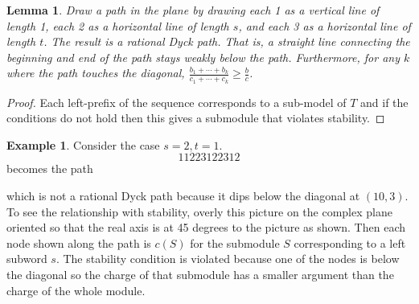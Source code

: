 \documentclass{amsart}
\numberwithin{equation}{section}
\numberwithin{figure}{section}
\numberwithin{table}{section}
\newtheorem{Lemma}[equation]{Lemma}
\theoremstyle{definition}
\newtheorem{Example}[equation]{Example}
\begin{document}
\begin{Lemma} \label{lem:Dyck}
Draw a path in the plane by drawing each 1 as a vertical line of length 1, each 2 as a horizontal line of length $s$, and each 3 as a horizontal line of length $t$. The result is a rational Dyck path. That is, a straight line connecting the beginning and end of the path stays weakly below the path. Furthermore, for any $k$ where the path touches the diagonal, $\frac{b_1+\cdots +b_k}{c_1+\cdots+c_k} \geq  \frac{b}{c}$.
\end{Lemma}

\begin{proof}
Each left-prefix of the sequence corresponds to a sub-model of $T$ and if the conditions do not hold then this gives a submodule that violates stability. 
\end{proof}


\begin{Example} Consider the case $s=2,t=1$. 
$$11223122312$$
becomes the path
\begin{center}
\end{center}
which is not a rational Dyck path because it dips below the diagonal at $(10,3)$.
To see the relationship with stability, overly this picture on the complex plane oriented so that the real axis is at 45 degrees to the picture as shown. Then each node shown along the path is $c(S)$ for the submodule $S$ corresponding to a left subword $s$. The stability condition is violated because one of the nodes is below the diagonal so the charge of that submodule has a smaller argument than the charge of the whole module. 
\end{Example}
\end{document}
